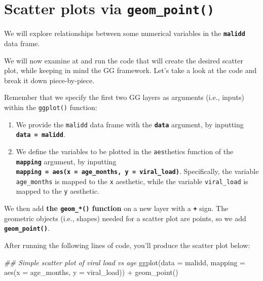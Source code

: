 \documentclass[
  letterpaper,
  DIV=11,
  numbers=noendperiod]{scrreprt}
\newenvironment{Shaded}{\begin{snugshade}}{\end{snugshade}}
\newcommand{\AttributeTok}[1]{\textcolor[rgb]{0.40,0.45,0.13}{#1}}
\newcommand{\DocumentationTok}[1]{\textcolor[rgb]{0.37,0.37,0.37}{\textit{#1}}}
\newcommand{\FunctionTok}[1]{\textcolor[rgb]{0.28,0.35,0.67}{#1}}
\newcommand{\NormalTok}[1]{\textcolor[rgb]{0.00,0.23,0.31}{#1}}
\newcommand{\SpecialCharTok}[1]{\textcolor[rgb]{0.37,0.37,0.37}{#1}}
\providecommand{\tightlist}{%
  \setlength{\itemsep}{0pt}\setlength{\parskip}{0pt}}\usepackage{longtable,booktabs,array}
\begin{document}
\hypertarget{scatter-plots-via-geom_point}{%
\section{\texorpdfstring{Scatter plots via
\texttt{geom\_point()}}{Scatter plots via geom\_point()}}\label{scatter-plots-via-geom_point}}

We will explore relationships between some numerical variables in the
\textbf{\texttt{malidd}} data frame.

We will now examine at and run the code that will create the desired
scatter plot, while keeping in mind the GG framework. Let's take a look
at the code and break it down piece-by-piece.

Remember that we specify the first two GG layers as arguments (i.e.,
inputs) within the \texttt{ggplot()} function:

\begin{enumerate}
\def\labelenumi{\arabic{enumi}.}
\tightlist
\item
  We provide the \texttt{malidd} data frame with the
  \textbf{\texttt{data}} argument, by inputting
  \textbf{\texttt{data\ =\ malidd}}.
\item
  We define the variables to be plotted in the \texttt{aes}thetics
  function of the \textbf{\texttt{mapping}} argument, by inputting
  \textbf{\texttt{mapping\ =\ aes(x\ =\ age\_months,\ y\ =\ viral\_load)}}.
  Specifically, the variable \texttt{age\_months} is mapped to the
  \texttt{x} aesthetic, while the variable \texttt{viral\_load} is
  mapped to the \texttt{y} aesthetic.
\end{enumerate}

We then add \textbf{the \texttt{geom\_*()} function} on a new layer with
a \textbf{\texttt{+}} sign. The geometric objects (i.e., shapes) needed
for a scatter plot are points, so we add
\textbf{\texttt{geom\_point()}}.

After running the following lines of code, you'll produce the scatter
plot below:

\begin{Shaded}
\begin{Highlighting}[]
\DocumentationTok{\#\# Simple scatter plot of viral load vs age}
\FunctionTok{ggplot}\NormalTok{(}\AttributeTok{data =}\NormalTok{ malidd, }
       \AttributeTok{mapping =} \FunctionTok{aes}\NormalTok{(}\AttributeTok{x =}\NormalTok{ age\_months, }
                     \AttributeTok{y =}\NormalTok{ viral\_load)) }\SpecialCharTok{+} 
  \FunctionTok{geom\_point}\NormalTok{()}
\end{Highlighting}
\end{Shaded}
\end{document}
